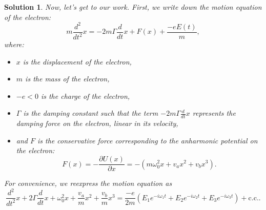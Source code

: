 \documentclass[UTF8,10pt,a4paper]{article}
\theoremstyle{Problem}
\theoremstyle{Solution}
\newtheorem*{sol}{Solution}
\begin{document}
\begin{sol}
    Now, let's get to our work. First, we write down the motion equation of the electron:
    \begin{equation}
        m\frac{d^2}{dt^2}x=-2m\Gamma\frac{d}{dt}x+F(x)+\frac{-eE(t)}{m},
    \end{equation}
    where:
    \begin{itemize}
        \item $x$ is the displacement of the electron,
        \item $m$ is the mass of the electron,
        \item $-e<0$ is the charge of the electron,
        \item $\Gamma$ is the damping constant such that the term $-2m\Gamma\frac{d}{dt}x$ represents the damping force on the electron, linear in its velocity,
        \item and $F$ is the conservative force corresponding to the anharmonic potential on the electron:
              \begin{equation}
                  F(x)=-\frac{\partial U(x)}{\partial x}=-(m\omega_0^2x+v_ax^2+v_bx^3).
              \end{equation}
    \end{itemize}
    For convenience, we reexpress the motion equation as
    \begin{equation}
        \label{motion-equ}
        \frac{d^2}{dt^2}x+2\Gamma\frac{d}{dt}x+\omega_0^2x+\frac{v_a}{m}x^2+\frac{v_b}{m}x^3=\frac{-e}{2m}\left(E_1e^{-i\omega_1t}+E_2e^{-i\omega_2t}+E_3e^{-i\omega_3t}\right)+\text{c.c.}.
    \end{equation}


\end{sol}
\end{document}
